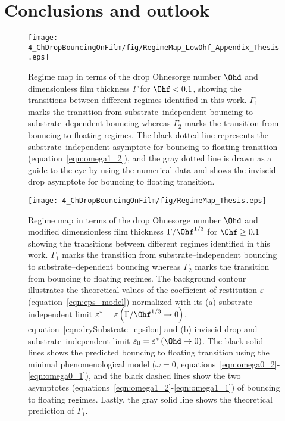 \section{Conclusions and outlook}
\label{sec:Conclusions and Outlook}
\begin{figure}
	\centering
	\texttt{[image: 4\_ChDropBouncingOnFilm/fig/RegimeMap\_LowOhf\_Appendix\_Thesis.eps]}
	\caption{Regime map in terms of the drop Ohnesorge number $\Ohd$ and dimensionless film thickness $\Gamma$ for $\Ohf < 0.1$, showing the transitions between different regimes identified in this work. $\Gamma_1$ marks the transition from substrate--independent bouncing to substrate--dependent bouncing whereas $\Gamma_2$ marks the transition from bouncing to floating regimes. The black dotted line represents the substrate--independent asymptote for bouncing to floating transition (equation~\eqref{eqn:omega1_2}), and the gray dotted line is drawn as a guide to the eye by using the numerical data and shows the inviscid drop asymptote for bouncing to floating transition.}
	\label{fig:LowOhfRegime}
\end{figure}
\begin{sidewaysfigure}
	\centering
	\texttt{[image: 4\_ChDropBouncingOnFilm/fig/RegimeMap\_Thesis.eps]}
	\caption{Regime map in terms of the drop Ohnesorge number $\Ohd$ and modified dimensionless film thickness $\Gamma/\Ohf^{1/3}$ for $\Ohf \ge 0.1$ showing the transitions between different regimes identified in this work. $\Gamma_1$ marks the transition from substrate--independent bouncing to substrate--dependent bouncing whereas $\Gamma_2$ marks the transition from bouncing to floating regimes. The background contour illustrates the theoretical values of the coefficient of restitution $\varepsilon$ (equation~\eqref{eqn:eps_model}) normalized with its (a) substrate--independent limit $\varepsilon^* = \varepsilon\left(\Gamma/\Ohf^{1/3} \to 0\right)$, equation~\eqref{eqn:drySubstrate_epsilon} and (b) inviscid drop and substrate--independent limit $\varepsilon_0 = \varepsilon^*\left(\Ohd \to 0\right)$. The black solid lines shows the predicted bouncing to floating transition using the minimal phenomenological model ($\omega = 0$, equations~\eqref{eqn:omega0_2}-\eqref{eqn:omega0_1}), and the black dashed lines show the two asymptotes (equations~\eqref{eqn:omega1_2}-\eqref{eqn:omega1_1}) of bouncing to floating regimes. Lastly, the gray solid line shows the theoretical prediction of $\Gamma_1$.}
	\label{fig:regimeMap}
\end{sidewaysfigure}

